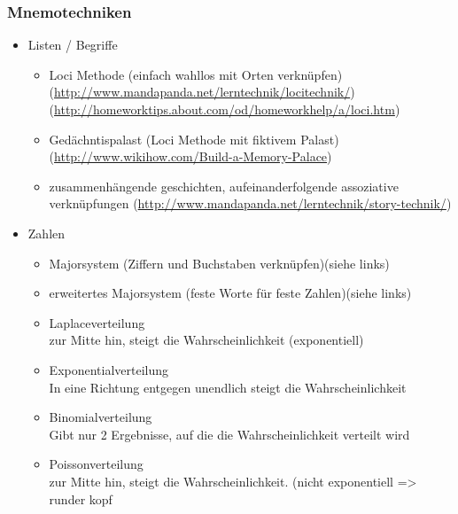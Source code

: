 \documentclass[11pt]{article}
\begin{document}
\subsubsection{Mnemotechniken}
\label{sec-2-3-1}
\begin{itemize}

\item Listen / Begriffe
\label{sec-2-3-1-1}%
\begin{itemize}
\item Loci Methode (einfach wahllos mit Orten verknüpfen)
     (\href{http://www.mandapanda.net/lerntechnik/locitechnik/}{http://www.mandapanda.net/lerntechnik/locitechnik/})
     (\href{http://homeworktips.about.com/od/homeworkhelp/a/loci.htm}{http://homeworktips.about.com/od/homeworkhelp/a/loci.htm})
\item Gedächntispalast (Loci Methode mit fiktivem Palast)(\href{http://www.wikihow.com/Build-a-Memory-Palace}{http://www.wikihow.com/Build-a-Memory-Palace})
\item zusammenhängende geschichten, aufeinanderfolgende assoziative verknüpfungen (\href{http://www.mandapanda.net/lerntechnik/story-technik/}{http://www.mandapanda.net/lerntechnik/story-technik/})
\end{itemize}

\item Zahlen
\label{sec-2-3-1-2}%
\begin{itemize}
\item Majorsystem  (Ziffern und Buchstaben verknüpfen)(siehe links)
\item erweitertes Majorsystem (feste Worte für feste Zahlen)(siehe links)
\end{itemize}
\begin{itemize}

\item Laplaceverteilung\\
\label{sec-3-2-1}%
zur Mitte hin, steigt die Wahrscheinlichkeit (exponentiell)

\item Exponentialverteilung\\
\label{sec-3-2-2}%
In eine Richtung entgegen unendlich steigt die Wahrscheinlichkeit

\item Binomialverteilung\\
\label{sec-3-2-3}%
Gibt nur 2 Ergebnisse, auf die die Wahrscheinlichkeit verteilt wird

\item Poissonverteilung\\
\label{sec-3-2-4}%
zur Mitte hin, steigt die Wahrscheinlichkeit. (nicht exponentiell => runder kopf
\end{itemize} %
\end{itemize} %
\end{document}
